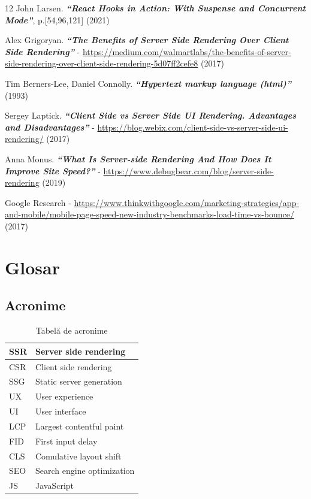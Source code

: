 \documentclass[12pt, a4paper]{report}
\begin{document}
\begin{thebibliography} {12}
	John Larsen. \textbf{\textit{“React Hooks in Action: With Suspense and Concurrent Mode”}}, p.[54,96,121] (2021)

	 Alex Grigoryan. \textbf{\textit{“The Benefits of Server Side Rendering Over Client Side Rendering”}} - \url{https://medium.com/walmartlabs/the-benefits-of-server-side-rendering-over-client-side-rendering-5d07ff2cefe8} (2017)

	 Tim Berners-Lee, Daniel Connolly. \textbf{\textit{“Hypertext markup language (html)”}} (1993)

	 Sergey Laptick. \textbf{\textit{“Client Side vs Server Side UI Rendering. Advantages and Disadvantages”}} -  \url{https://blog.webix.com/client-side-vs-server-side-ui-rendering/} (2017)

	 Anna Monus. \textbf{\textit{“What Is Server-side Rendering And How Does It Improve Site Speed?”}} -  \url{https://www.debugbear.com/blog/server-side-rendering} (2019)

	 Google Research - \url{https://www.thinkwithgoogle.com/marketing-strategies/app-and-mobile/mobile-page-speed-new-industry-benchmarks-load-time-vs-bounce/} (2017)


\end{thebibliography}


\appendix %

\chapter{Glosar}


\section{Acronime}

\begin{table} [H]
	\begin{tabular} {|  l | L{10cm} |}
		\hline
		SSR & Server side rendering      \\ [0.2ex]
		\hline
		CSR & Client side rendering      \\ [0.2ex]
		\hline
		SSG & Static server generation   \\ [0.2ex]
		\hline
		UX  & User experience            \\ [0.2ex]
		\hline
		UI  & User interface             \\ [0.2ex]
		\hline
		LCP & Largest contentful paint   \\ [0.2ex]
		\hline
		FID & First input delay          \\ [0.2ex]
		\hline
		CLS & Comulative layout shift    \\ [0.2ex]
		\hline
		SEO & Search engine optimization \\ [0.2ex]
		\hline
		JS  & JavaScript                 \\ [0.2ex]
		\hline
	\end{tabular}
	\caption{Tabelă de acronime}
	\label{table:acron}
\end{table}

\end{document}
